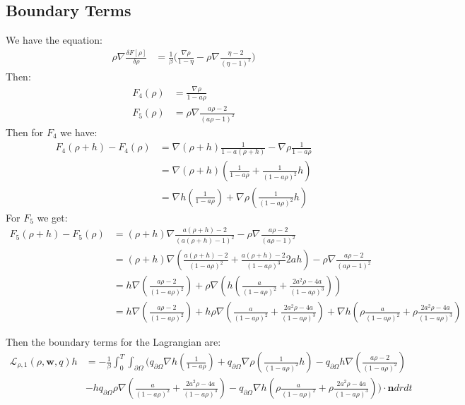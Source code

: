 \documentclass[11pt, a4paper]{article}
\theoremstyle{definition}
\newcommand{\w}{\mathbf{w}}
\newcommand{\n}{\mathbf{n}}
\begin{document}
\subsection{Boundary Terms}
We have the equation:
\begin{align*}
	\rho \nabla \frac{\delta F[\rho]}{\delta \rho} &= \frac{1}{\beta} \bigg(  \frac{\nabla \rho}{1 - \eta}  - \rho \nabla\frac{\eta - 2}{(\eta - 1)^2}  \bigg)
\end{align*}
Then:
\begin{align*}
	F_4(\rho) &= \frac{\nabla \rho}{1 - a \rho}\\
	F_5(\rho) &= \rho \nabla\frac{a \rho - 2}{(a \rho - 1)^2}  
\end{align*}
Then for $F_4$ we have:
\begin{align*}
	F_4(\rho+h) - F_4(\rho) &=\nabla (\rho + h) \frac{1}{1 - a (\rho + h)} - \nabla \rho \frac{1}{1 - a \rho}\\
	&= \nabla(\rho + h) \left(\frac{1}{1 - a\rho} + \frac{1}{(1 -a \rho)^2}h \right)\\
	&= \nabla h \left(\frac{1}{1 - a\rho}\right) + \nabla \rho \left( \frac{1}{(1 -a \rho)^2}h \right)
\end{align*}
For $F_5$ we get:
\begin{align*}
	F_5(\rho + h) - F_5(\rho) &= (\rho + h) \nabla\frac{a (\rho +h) - 2}{(a (\rho +h) - 1)^2}  - \rho \nabla\frac{a \rho - 2}{(a \rho - 1)^2} \\
	&=(\rho + h) \nabla \left( \frac{a (\rho +h) - 2}{(1- a \rho)^2} + \frac{a (\rho +h) - 2}{(1- a \rho)^3} 2ah\right) - \rho \nabla\frac{a \rho - 2}{(a \rho - 1)^2} \\
	&= h \nabla \left(\frac{a \rho  - 2}{(1- a \rho)^2}\right) + \rho \nabla \left( h\left( \frac{a}{(1- a \rho)^2} + \frac{2a^2\rho - 4a}{(1- a \rho)^3} \right)\right)\\
	&= h \nabla \left(\frac{a \rho  - 2}{(1- a \rho)^2}\right) + h \rho \nabla \left( \frac{a}{(1- a \rho)^2} + \frac{2a^2\rho - 4a}{(1- a \rho)^3} \right) + \nabla h \left( \rho \frac{a}{(1- a \rho)^2} + \rho\frac{2a^2\rho - 4a}{(1- a \rho)^3} \right)
\end{align*}

Then the boundary terms for the Lagrangian are:
\begin{align*}
	\mathcal{L}_{\rho,1}(\rho,\w, q) h &= - \frac{1}{\beta}\int_0^T \int_{\partial \Omega} \bigg( q_{\partial \Omega}\nabla h \left(\frac{1}{1 - a\rho}\right) + q_{\partial \Omega}\nabla \rho \left( \frac{1}{(1 -a \rho)^2}h \right)- q_{\partial \Omega}h \nabla \left(\frac{a \rho  - 2}{(1- a \rho)^2}\right) \\
	&- h q_{\partial \Omega}\rho \nabla \left( \frac{a}{(1- a \rho)^2} + \frac{2a^2\rho - 4a}{(1- a \rho)^3} \right) - q_{\partial \Omega}\nabla h \left( \rho \frac{a}{(1- a \rho)^2} + \rho\frac{2a^2\rho - 4a}{(1- a \rho)^3} \right) \bigg) \cdot \n dr dt
\end{align*}
\end{document}
